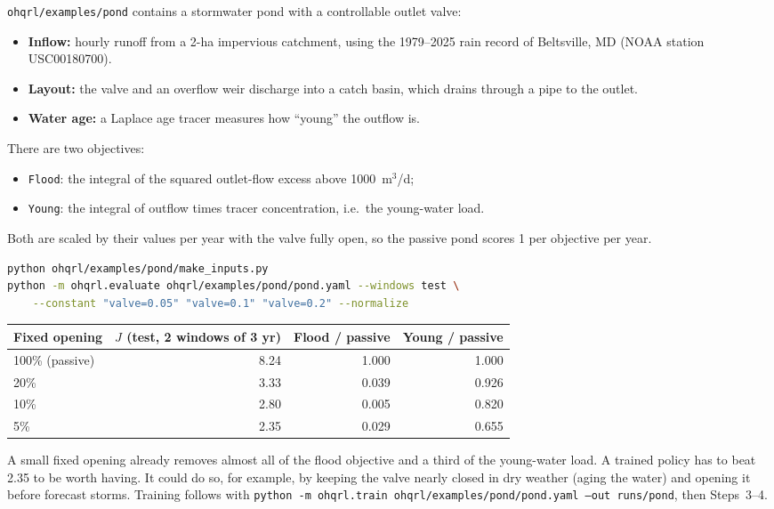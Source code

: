 \documentclass[11pt]{article}
\newcommand{\code}[1]{\texttt{#1}}
\begin{document}
\code{ohqrl/examples/pond} contains a stormwater pond with a controllable
outlet valve:
\begin{itemize}[nosep]
\item \textbf{Inflow:} hourly runoff from a 2-ha impervious catchment, using
  the 1979--2025 rain record of Beltsville, MD (NOAA station
  USC00180700).
\item \textbf{Layout:} the valve and an overflow weir discharge into a catch
  basin, which drains through a pipe to the outlet.
\item \textbf{Water age:} a Laplace age tracer measures how ``young'' the
  outflow is.
\end{itemize}
There are two objectives:
\begin{itemize}[nosep]
\item \code{Flood}: the integral of the squared outlet-flow excess above
  1000~m$^3$/d;
\item \code{Young}: the integral of outflow times tracer concentration, i.e.\
  the young-water load.
\end{itemize}
Both are scaled by their values per year with the valve fully open, so
the passive pond scores 1 per objective per year.

\begin{lstlisting}[language=bash]
python ohqrl/examples/pond/make_inputs.py
python -m ohqrl.evaluate ohqrl/examples/pond/pond.yaml --windows test \
    --constant "valve=0.05" "valve=0.1" "valve=0.2" --normalize
\end{lstlisting}
\begin{center}\small
\begin{tabular}{@{}lrrr@{}}
\toprule
Fixed opening & $J$ (test, 2 windows of 3 yr) & Flood / passive & Young / passive\\
\midrule
100\% (passive) & 8.24 & 1.000 & 1.000\\
20\% & 3.33 & 0.039 & 0.926\\
10\% & 2.80 & 0.005 & 0.820\\
5\% & 2.35 & 0.029 & 0.655\\
\bottomrule
\end{tabular}
\end{center}
A small fixed opening already removes almost all of the flood objective
and a third of the young-water load. A trained policy has to beat 2.35 to
be worth having. It could do so, for example, by keeping the valve nearly
closed in dry weather (aging the water) and opening it before forecast
storms. Training follows with \code{python -m ohqrl.train
ohqrl/examples/pond/pond.yaml --out runs/pond}, then Steps~3--4.
\end{document}
